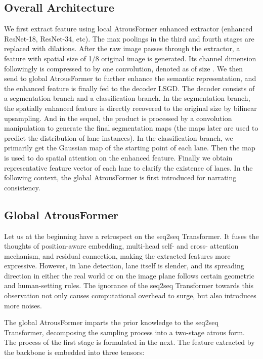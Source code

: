 \documentclass[preprint,12pt,review]{elsarticle}
\begin{document}
\subsection{Overall Architecture}
We first extract feature using local AtrousFormer enhanced extractor (enhanced ResNet-18, ResNet-34, etc). The max poolings in the third and fourth stages are replaced with dilations. After the raw image passes through the extractor, a feature with spatial size of 1/8 original image is generated. Its channel dimension followingly is compressed to  by one  convolution, denoted as  of size . We then send  to global AtrousFormer to further enhance the semantic representation, and the enhanced feature is finally fed to the decoder LSGD. The decoder consists of a segmentation branch and a classification branch. In the segmentation branch, the spatially enhanced feature is directly recovered to the original size by  bilinear upsampling. And in the sequel, the product is processed by a convolution manipulation to generate the final segmentation maps (the maps later are used to predict the distribution of lane instances). In the classification branch, we primarily get the Gaussian map of the starting point of each lane. Then the map is used to do spatial attention on the enhanced feature. Finally we obtain representative feature vector of each lane to clarify the existence of lanes. In the following context, the global AtrousFormer is first introduced for narrating consistency.

\subsection{Global AtrousFormer}
Let us at the beginning have a retrospect on the seq2seq Transformer. It fuses the thoughts of position-aware embedding, multi-head self- and cross- attention mechanism, and residual connection, making the extracted features more expressive. However, in lane detection, lane itself is slender, and its spreading direction in either the real world or on the image plane follows certain geometric and human-setting rules.  The ignorance of the seq2seq Transformer towards this observation not only causes computational overhead to surge, but also introduces more noises.

The global AtrousFormer imparts the prior knowledge to the seq2seq Transformer, decomposing the sampling process into a two-stage atrous form. The process of the first stage is formulated in the next. The feature  extracted by the backbone is embedded into three tensors:
\end{document}
